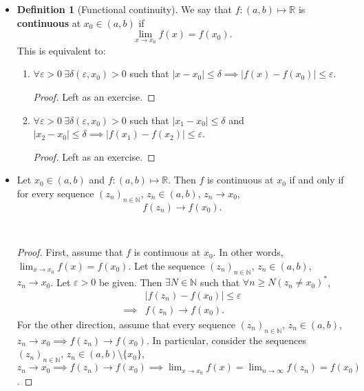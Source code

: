 \documentclass{article}
\newcommand{\R}{\mathbb{R}}
\newcommand{\N}{\mathbb{N}}
\newcommand{\seq}[2]{(#1_{#2})_{#2 \in \N}}
\newcommand{\?}{\stackrel{?}{=}}
\theoremstyle{definition} %
\newtheorem{definition}[subsection]{Definition} %
\begin{document}
\begin{itemize}
    \item[]
    \begin{definition}[Functional continuity]
        We say that $f: (a, b) \mapsto \R$ is \textbf{continuous} at $x_0 \in (a, b)$ if
        $$\lim_{x \to x_0} f(x) = f(x_0).$$
        This is equivalent to:
        \begin{enumerate}[label=(\roman*)]
            \item $\forall \varepsilon > 0 \ \exists \delta(\varepsilon, x_0) > 0$ such that $|x - x_0| \leq \delta \implies |f(x) - f(x_0)| \leq \varepsilon$.
            \begin{proof}
                Left as an exercise. 
            \end{proof}
            \item $\forall \varepsilon > 0 \ \exists \delta(\varepsilon, x_0) > 0$ such that $|x_1 - x_0| \leq \delta$ and $|x_2 - x_0| \leq \delta \implies |f(x_1) - f(x_2)| \leq \varepsilon$.
            \begin{proof}
                Left as an exercise.
            \end{proof}
        \end{enumerate}
    \end{definition}
    \item[]
    \begin{lemma}
        Let $x_0 \in (a, b)$ and $f: (a, b) \mapsto \R$. Then $f$ is continuous at $x_0$ if and only if for every sequence $\seq{z}{n}$, $z_n \in (a, b)$, $z_n \rightarrow x_0$,
        $$f(z_n) \rightarrow f(x_0).$$
    \end{lemma}\
    \begin{proof}
        First, assume that $f$ is continuous at $x_0$. In other words, $\lim_{x \to x_0} f(x) = f(x_0)$. Let the sequence $\seq{z}{n}$, $z_n \in (a, b)$, $z_n \rightarrow x_0$. Let $\varepsilon > 0$ be given. Then $\exists N \in \N$ such that $\forall n \geq N (z_n \neq x_0)^*$,
        \begin{align*}
            &|f(z_n) - f(x_0)| \leq \varepsilon \\
            \implies& f(z_n) \longrightarrow f(x_0).
        \end{align*}
        For the other direction, assume that every sequence $\seq{z}{n}$, $z_n \in (a, b)$, $z_n \rightarrow x_0 \implies f(z_n) \rightarrow f(x_0)$. In particular, consider the sequences $\seq{z}{n}$, $z_n \in (a, b) \setminus \{x_0\}$, $z_n \rightarrow x_0 \implies f(z_n) \rightarrow f(x_0) \implies \lim_{x \to x_0} f(x) = \lim_{n \to \infty} f(z_n) = f(x_0)$.

\end{proof}
\end{itemize}
\end{document}
